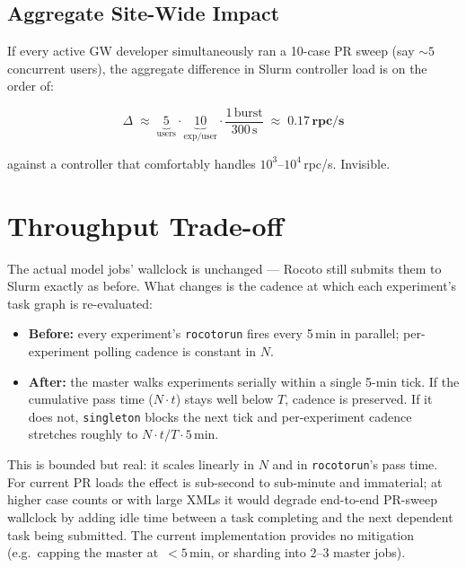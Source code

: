 \documentclass[11pt]{article}
\newcommand{\code}[1]{\texttt{#1}}
\begin{document}
\subsection{Aggregate Site-Wide Impact}

If every active GW developer simultaneously ran a 10-case PR sweep
(say $\sim 5$ concurrent users), the aggregate difference in Slurm
controller load is on the order of:

\begin{equation}
\Delta \;\approx\;
  \underbrace{5}_{\text{users}} \cdot
  \underbrace{10}_{\text{exp/user}} \cdot
  \frac{1\,\text{burst}}{300\,\text{s}}
  \;\approx\; \mathbf{0.17\,\text{rpc/s}}
\end{equation}

against a controller that comfortably handles
$10^{3}\text{--}10^{4}$\,rpc/s. Invisible.

\section{Throughput Trade-off}
\label{sec:throughput}

The actual model jobs' wallclock is unchanged --- Rocoto still submits
them to Slurm exactly as before. What changes is the cadence at which
each experiment's task graph is re-evaluated:

\begin{itemize}[leftmargin=*]
  \item \textbf{Before:} every experiment's \code{rocotorun} fires
        every 5\,min in parallel; per-experiment polling cadence is
        constant in $N$.
  \item \textbf{After:} the master walks experiments serially within a
        single 5-min tick. If the cumulative pass time
        ($N\cdot t$) stays well below $T$, cadence is preserved. If
        it does not, \code{singleton} blocks the next tick and
        per-experiment cadence stretches roughly to
        $N\cdot t / T \cdot 5$\,min.
\end{itemize}

This is bounded but real: it scales linearly in $N$ and in
\code{rocotorun}'s pass time. For current PR loads the effect is
sub-second to sub-minute and immaterial; at higher case counts or
with large XMLs it would degrade end-to-end PR-sweep wallclock by
adding idle time between a task completing and the next dependent
task being submitted. The current implementation provides no
mitigation (e.g.\ capping the master at~$<5$\,min, or sharding into
2--3 master jobs).
\end{document}

